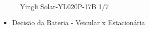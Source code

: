                   \begin{figure}[H]
    \centering
    \includegraphics[width=0.7]{figuras/painel_solar01}
    \caption{Yingli Solar-YL020P-17B 1/7 }
    \label{fig:painel_solar01}
\end{figure}
        
        
\begin{itemize}
\item Decisão da Bateria - Veicular x Estacionária
\end{itemize}

